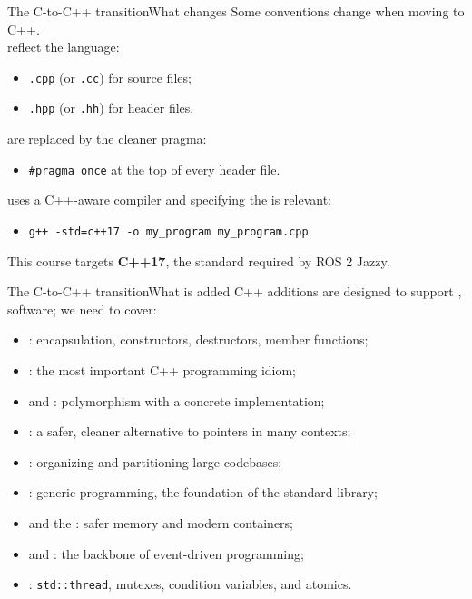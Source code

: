 \begin{frame}{The C-to-C++ transition}{What changes}
	\justifying
	Some conventions change when moving to C++.\\
	\bigskip
	 reflect the language:
	\begin{itemize}
		\item \texttt{.cpp} (or \texttt{.cc}) for source files;
		\item \texttt{.hpp} (or \texttt{.hh}) for header files.
	\end{itemize}
	\bigskip
	 are replaced by the cleaner pragma:
	\begin{itemize}
		\item \texttt{\#pragma once} at the top of every header file.
	\end{itemize}
	\bigskip
	 uses a C++-aware compiler and specifying the  is relevant:
	\begin{itemize}
		\item \texttt{g++ -std=c++17 -o my\_program my\_program.cpp}
	\end{itemize}
	\begin{block}{}
		\centering
		This course targets \textbf{C++17}, the standard required by ROS 2 Jazzy.
	\end{block}
\end{frame}
\begin{frame}{The C-to-C++ transition}{What is added}
	\justifying
	C++ additions are designed to support ,  software; we need to cover:
	\begin{itemize}
		\item {}: encapsulation, constructors, destructors, member functions;
		\item {}: the most important C++ programming idiom;
		\item {} and : polymorphism with a concrete implementation;
		\item {}: a safer, cleaner alternative to pointers in many contexts;
		\item {}: organizing and partitioning large codebases;
		\item {}: generic programming, the foundation of the standard library;
		\item {} and the : safer memory and modern containers;
		\item {} and : the backbone of event-driven programming;
		\item {}: \texttt{std::thread}, mutexes, condition variables, and atomics.
	\end{itemize}
\end{frame}
